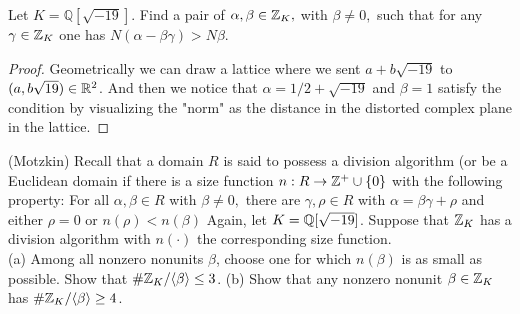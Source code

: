 \documentclass[12pt,twoside=semi,openright,numbers=noenddot]{scrbook}
\begin{document}
\begin{problem}
    Let $K=\mathbb{Q}[\sqrt{-19}]$. Find a pair of $\alpha, \beta \in \mathbb Z_{K},$ with $\beta \neq 0,$ such that for any $\gamma \in \mathbb Z_{K}$ one has $N(\alpha-\beta \gamma)>N \beta$.
\end{problem}
    \begin{proof}
        Geometrically we can draw a lattice where we sent $a+b\sqrt{-19}$ to $(a, b\sqrt{19}) \in \mathbb R^2$. And then we notice that $\alpha = 1/2+\sqrt{-19}$ and $\beta = 1$ satisfy the condition by 
        visualizing the "norm" as the distance in the distorted complex plane in the lattice.
    \end{proof}
\begin{problem}
    (Motzkin) Recall that a domain $R$ is said to possess a division algorithm (or be a Euclidean domain if there is a size function $n: R \rightarrow \mathbb Z^{+} \cup\{0\}$ with the following property: For all $\alpha, \beta \in R$ with $\beta \neq 0,$ there are $\gamma, \rho \in R$ with $\alpha=\beta \gamma+\rho$ and either $\rho=0$ or $n(\rho)<n(\beta)$
    Again, let $K=\mathbb Q[\sqrt{-19}]$. Suppose that $\mathbb Z_{K}$ has a division algorithm with $n(\cdot)$ the corresponding size function. \\
    (a) Among all nonzero nonunits $\beta$, choose one for which $n(\beta)$ is as small as possible. Show that $\# \mathbb Z_{K} /\langle\beta\rangle \leq 3$.
    (b) Show that any nonzero nonunit $\beta \in \mathbb Z_{K}$ has $\# \mathbb Z_{K} /\langle\beta\rangle \geq 4$.
\end{problem}
\end{document}
